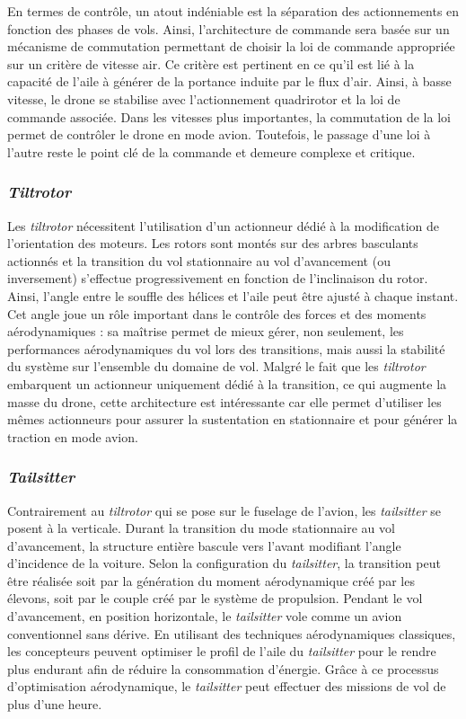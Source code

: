         En termes de contrôle, un atout indéniable est la séparation des actionnements en fonction des phases de vols. Ainsi, l'architecture de commande sera basée sur un mécanisme de commutation permettant de choisir la loi de commande appropriée sur un critère de vitesse air. Ce critère est pertinent en ce qu'il est lié à la capacité de l'aile à générer de la portance induite par le flux d'air. Ainsi, à basse vitesse, le drone se stabilise avec l'actionnement quadrirotor et la loi de commande associée. Dans les vitesses plus importantes, la commutation de la loi permet de contrôler le drone en mode avion. Toutefois, le passage d'une loi à l'autre reste le point clé de la commande et demeure complexe et critique.

        \subsubsection*{\textit{Tiltrotor}}

        Les \textit{tiltrotor} nécessitent l'utilisation d'un actionneur dédié à la modification de l'orientation des moteurs. Les rotors sont montés sur des arbres basculants actionnés et la transition du vol stationnaire au vol d'avancement (ou inversement) s'effectue progressivement en fonction de l'inclinaison du rotor. Ainsi, l'angle entre le souffle des hélices et l'aile peut être ajusté à chaque instant. Cet angle joue un rôle important dans le contrôle des forces et des moments aérodynamiques : sa maîtrise permet de mieux gérer, non seulement, les performances aérodynamiques du vol lors des transitions, mais aussi la stabilité du système sur l'ensemble du domaine de vol. 
        Malgré le fait que les \textit{tiltrotor} embarquent un actionneur uniquement dédié à la transition, ce qui augmente la masse du drone, cette architecture est intéressante car elle permet d'utiliser les mêmes actionneurs pour assurer la sustentation en stationnaire et pour générer la traction en mode avion.

        \subsubsection*{\textit{Tailsitter}}
        Contrairement au \textit{tiltrotor} qui se pose sur le fuselage de l'avion, les \textit{tailsitter} se posent à la verticale. Durant la transition du mode stationnaire au vol d'avancement, la structure entière bascule vers l'avant modifiant l'angle d'incidence de la voiture. Selon la configuration du \textit{tailsitter}, la transition peut être réalisée soit par la génération du moment aérodynamique créé par les élevons, soit par le couple créé par le système de propulsion. Pendant le vol d'avancement, en position horizontale, le \textit{tailsitter} vole comme un avion conventionnel sans dérive. En utilisant des techniques aérodynamiques classiques, les concepteurs peuvent optimiser le profil de l'aile du \textit{tailsitter} pour le rendre plus endurant afin de réduire la consommation d'énergie. Grâce à ce processus d'optimisation aérodynamique, le \textit{tailsitter} peut effectuer des missions de vol de plus d'une heure.
        
